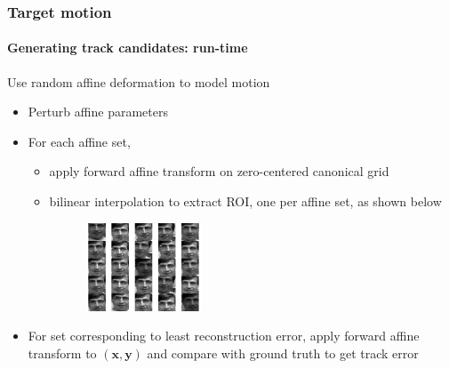 \begin{frame}
\frametitle{Target motion}
\framesubtitle{Generating track candidates: run-time}
\mypagenum{}
Use random affine deformation to model motion
\begin{itemize}
\item Perturb affine parameters
\item For each affine set, 
\begin{itemize}
\item apply forward affine transform on zero-centered canonical grid 
\item bilinear interpolation to extract ROI, one per affine set, as shown below
\begin{figure}[t]
\centering
\includegraphics[width=0.35\textwidth]{thesis/affineCandidates.pdf}
\label{Fig:affine_candidates}
\end{figure}
\end{itemize}
\item For set corresponding to least reconstruction error, apply forward affine transform to $(\mathbf{x, y})$ and compare with ground truth to get track error
\end{itemize}
\end{frame}



